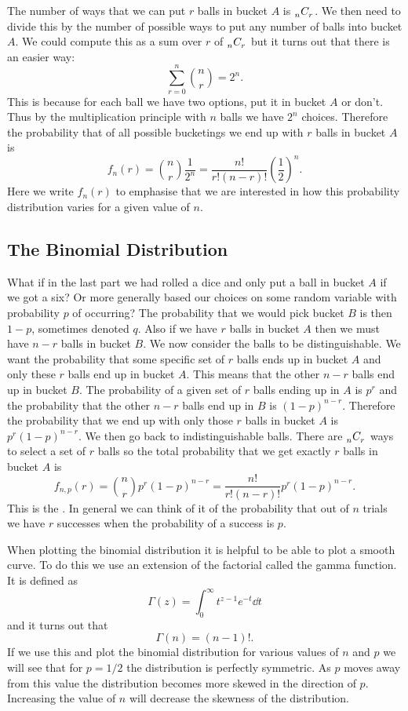 \documentclass[a4paper]{article}
\newcommand{\combs}[2]{\tensor[_{#1}]{C}{_{#2}}}
\begin{document}
    The number of ways that we can put \(r\) balls in bucket \(A\) is \(\combs{n}{r}\).
    We then need to divide this by the number of possible ways to put any number of balls into bucket \(A\).
    We could compute this as a sum over \(r\) of \(\combs{n}{r}\) but it turns out that there is an easier way:
    \[\sum_{r=0}^{n}{n \choose r} = 2^n.\]
    This is because for each ball we have two options, put it in bucket \(A\) or don't.
    Thus by the multiplication principle with \(n\) balls we have \(2^n\) choices.
    Therefore the probability that of all possible bucketings we end up with \(r\) balls in bucket \(A\) is
    \[f_n(r) = {n \choose r}\frac{1}{2^n} = \frac{n!}{r!(n-r)!}\left(\frac{1}{2}\right)^n.\]
    Here we write \(f_n(r)\) to emphasise that we are interested in how this probability distribution varies for a given value of \(n\).
    
    \subsection{The Binomial Distribution}
    What if in the last part we had rolled a dice and only put a ball in bucket \(A\) if we got a six?
    Or more generally based our choices on some random variable with probability \(p\) of occurring?
    The probability that we would pick bucket \(B\) is then \(1 - p\), sometimes denoted \(q\).
    Also if we have \(r\) balls in bucket \(A\) then we must have \(n - r\) balls in bucket \(B\).
    We now consider the balls to be distinguishable.
    We want the probability that some specific set of \(r\) balls ends up in bucket \(A\) and only these \(r\) balls end up in bucket \(A\).
    This means that the other \(n - r\) balls end up in bucket \(B\).
    The probability of a given set of \(r\) balls ending up in \(A\) is \(p^r\) and the probability that the other \(n - r\) balls end up in \(B\) is \((1 - p)^{n-r}\).
    Therefore the probability that we end up with only those \(r\) balls in bucket \(A\) is \(p^r(1 - p)^{n-r}\).
    We then go back to indistinguishable balls.
    There are \(\combs{n}{r}\) ways to select a set of \(r\) balls so the total probability that we get exactly \(r\) balls in bucket \(A\) is
    \[f_{n,p}(r) = {n \choose r}p^r(1 - p)^{n-r} = \frac{n!}{r!(n-r)!} p^r(1 - p)^{n-r}.\]
    This is the .
    In general we can think of it of the probability that out of \(n\) trials we have \(r\) successes when the probability of a success is \(p\).
    
    When plotting the binomial distribution it is helpful to be able to plot a smooth curve.
    To do this we use an extension of the factorial called the gamma function.
    It is defined as
    \[\Gamma(z) = \int_0^\infty t^{z-1}e^{-t}\dd{t}\]
    and it turns out that
    \[\Gamma(n) = (n-1)!.\]
    If we use this and plot the binomial distribution for various values of \(n\) and \(p\) we will see that for \(p = 1/2\) the distribution is perfectly symmetric.
    As \(p\) moves away from this value the distribution becomes more skewed in the direction of \(p\).
    Increasing the value of \(n\) will decrease the skewness of the distribution.
    
\end{document}
